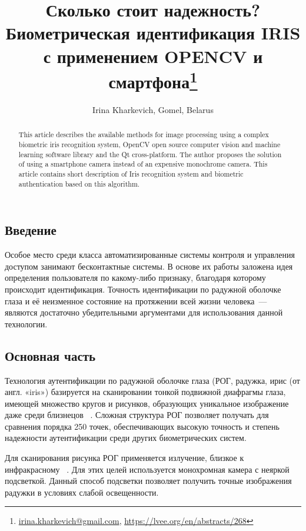 \documentclass[10pt, a5paper]{article}
\begin{document}
\title{Сколько стоит надежность? Биометрическая идентификация IRIS с применением OPENCV и смартфона\footnote{\url{irina.kharkevich@gmail.com}, \url{https://lvee.org/en/abstracts/268}}}
\author{Irina Kharkevich, Gomel, Belarus}
\maketitle
\begin{abstract}
This article describes the available methods for image processing using a complex biometric iris recognition system, OpenCV open source computer vision and machine learning software library and the Qt cross-platform. The author proposes the solution of using a smartphone camera instead of an expensive monochrome camera. This article contains short description of Iris recognition system and biometric authentication based on this algorithm.
\end{abstract}
\subsection*{Введение}
Особое место среди класса автоматизированные системы контроля и управления доступом занимают бесконтактные системы. В основе их работы заложена идея определения пользователя по какому-либо признаку, благодаря которому происходит идентификация. Точность идентификации по радужной оболочке глаза и её неизменное состояние на протяжении всей жизни человека~--- являются достаточно убедительными аргументами для использования данной технологии.

\subsection*{Основная часть}
Технология аутентификации по радужной оболочке глаза (РОГ, радужка, ирис (от англ. «iris») базируется на сканировании тонкой подвижной диафрагмы глаза, имеющей множество кругов и рисунков, образующих уникальное изображение даже среди близнецов ~\cite{Kharkevich-1}. Сложная структура РОГ позволяет получать для сравнения порядка 250 точек, обеспечивающих высокую точность и степень надежности аутентификации среди других биометрических систем.

Для сканирования рисунка РОГ применяется излучение, близкое к инфракрасному ~\cite{Kharkevich-2}. Для этих целей используется монохромная камера с неяркой подсветкой. Данный способ подсветки позволяет получить точные изображения радужки в условиях слабой освещенности.
\end{document}
